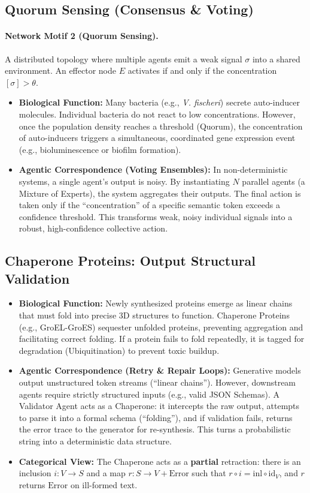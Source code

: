 \subsection{Quorum Sensing (Consensus \& Voting)}

\paragraph{Network Motif 2 (Quorum Sensing).}
A distributed topology where multiple agents emit a weak signal $\sigma$ into a shared environment. An effector
node $E$ activates if and only if the concentration $[\sigma] > \theta$.
\begin{itemize}[leftmargin=*]
\item \textbf{Biological Function:} Many bacteria (e.g., \emph{V. fischeri}) secrete auto-inducer molecules.
Individual bacteria do not react to low concentrations. However, once the population density reaches a threshold
(Quorum), the concentration of auto-inducers triggers a simultaneous, coordinated gene expression event (e.g.,
bioluminescence or biofilm formation).
\item \textbf{Agentic Correspondence (Voting Ensembles):} In non-deterministic systems, a single agent's output is
noisy. By instantiating $N$ parallel agents (a Mixture of Experts), the system aggregates their outputs. The
final action is taken only if the ``concentration'' of a specific semantic token exceeds a confidence threshold.
This transforms weak, noisy individual signals into a robust, high-confidence collective action.
\end{itemize}

\subsection{Chaperone Proteins: Output Structural Validation}

\begin{itemize}[leftmargin=*]
\item \textbf{Biological Function:} Newly synthesized proteins emerge as linear chains that must fold into
precise 3D structures to function. Chaperone Proteins (e.g., GroEL-GroES) sequester unfolded proteins,
preventing aggregation and facilitating correct folding. If a protein fails to fold repeatedly, it is tagged for
degradation (Ubiquitination) to prevent toxic buildup.
\item \textbf{Agentic Correspondence (Retry \& Repair Loops):} Generative models output unstructured token streams
(``linear chains''). However, downstream agents require strictly structured inputs (e.g., valid JSON Schemas).
A Validator Agent acts as a Chaperone: it intercepts the raw output, attempts to parse it into a formal schema
(``folding''), and if validation fails, returns the error trace to the generator for re-synthesis. This turns a
probabilistic string into a deterministic data structure.
\item \textbf{Categorical View:} The Chaperone acts as a \textbf{partial} retraction: there is an inclusion
$i:V\to S$ and a map $r:S\to V+\mathrm{Error}$ such that $r\circ i=\mathrm{inl}\circ \mathrm{id}_V$, and $r$ returns
$\mathrm{Error}$ on ill-formed text.
\end{itemize}

